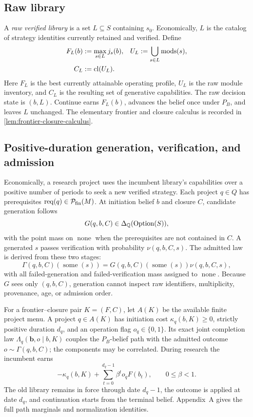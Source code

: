 \subsection{Raw library}

A \emph{raw verified library} is a set \(L\subseteq S\) containing \(s_0\).
Economically, \(L\) is the catalog of strategy identities currently retained
and verified.  Define
\begin{align}
  F_L(b)&:=\max_{s\in L}j_s(b),
  &U_L&:=\bigcup_{s\in L}\operatorname{mods}(s),\label{eq:frontier-union}\\
  C_L&:=\operatorname{cl}(U_L).\label{eq:raw-library-closure}
\end{align}
Here \(F_L\) is the best currently attainable operating profile, \(U_L\) is
the raw module inventory, and \(C_L\) is the resulting set of generative
capabilities.  The raw decision state is \((b,L)\).  Continue earns \(F_L(b)\),
advances the belief once under \(P_B\), and leaves \(L\) unchanged.  The
elementary frontier and closure calculus is recorded in
\cref{lem:frontier-closure-calculus}.

\subsection{Positive-duration generation, verification, and admission}

Economically, a research project uses the incumbent library's capabilities
over a positive number of periods to seek a new verified strategy.  Each
project \(q\in Q\) has prerequisites
\(\operatorname{req}(q)\in\mathcal{P}_{\mathrm{fin}}(M)\).  At initiation belief \(b\) and
closure \(C\), candidate generation follows
\[
  G(q,b,C)\in\Delta_{\mathbb{Q}}(\operatorname{Option}(S)),
\]
with the point mass on \(\operatorname{none}\) when the prerequisites are not
contained in \(C\).  A generated \(s\) passes verification with probability
\(\nu(q,b,C,s)\).  The admitted law is derived from these two stages:
\[
  \Gamma(q,b,C)(\operatorname{some}(s))
  =G(q,b,C)(\operatorname{some}(s))\nu(q,b,C,s),
\]
with all failed-generation and failed-verification mass assigned to
\(\operatorname{none}\).  Because \(G\) sees only \((q,b,C)\), generation cannot
inspect raw identifiers, multiplicity, provenance, age, or admission order.

For a frontier--closure pair \(K=(F,C)\), let \(A(K)\) be the available finite
project menu.  A project \(q\in A(K)\) has initiation cost
\(\kappa_q(b,K)\ge0\), strictly positive duration \(d_q\), and an operation
flag \(o_q\in\{0,1\}\).  Its exact joint completion law
\(\Lambda_q(\mathbf b,o\mid b,K)\) couples the \(P_B\)-belief path with the
admitted outcome \(o\sim\Gamma(q,b,C)\); the components may be correlated.
During research the incumbent earns
\[
  -\kappa_q(b,K)+\sum_{t=0}^{d_q-1}\beta^t o_qF(b_t),
  \qquad 0\le\beta<1.
\]
The old library remains in force through date \(d_q-1\), the outcome is
applied at date \(d_q\), and continuation starts from the terminal belief.
Appendix~A gives the full path marginals and normalization identities.

